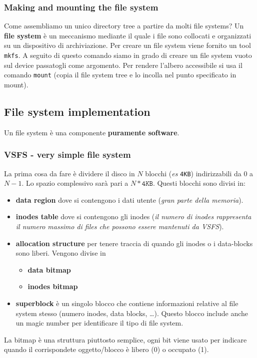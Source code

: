 \documentclass[12pt, letterpaper]{article}
\begin{document}
			\subsubsection{Making and mounting the file system}
				Come assembliamo un unico directory tree a partire da molti file systems? Un \textbf{file system} è un meccanismo mediante il quale i file sono collocati e organizzati su un dispositivo di archiviazione. Per creare un file system viene fornito un tool \texttt{mkfs}. A seguito di questo comando siamo in grado di creare un file system vuoto sul device passatogli come argomento. Per rendere l'albero accessibile si usa il comando \texttt{mount} (copia il file system tree e lo incolla nel punto specificato in mount).  
				 
		\subsection{File system implementation}
			Un file system è una componente \textbf{puramente software}.
			
			\subsubsection{VSFS - very simple file system}
				La prima cosa da fare è dividere il disco in $N$ blocchi (\textit{es} \texttt{4KB}) indirizzabili da $0$ a $N-1$. Lo spazio complessivo sarà pari a $N * \texttt{4KB}$. Questi blocchi sono divisi in:
				\begin{itemize}
					\item \textbf{data region} dove si contengono i dati utente (\textit{gran parte della memoria}).
					\item \textbf{inodes table} dove si contengono gli inodes (\textit{il numero di inodes rappresenta il numero massimo di files che possono essere mantenuti da VSFS}).
					\item \textbf{allocation structure} per tenere traccia di quando gli inodes o i data-blocks sono liberi. Vengono divise in
					\begin{itemize}
						\item \textbf{data bitmap}
						\item \textbf{inodes bitmap}
					\end{itemize}
					\item \textbf{superblock} è un singolo blocco che contiene informazioni relative al file system stesso (numero inodes, data blocks, \dots). Questo blocco include anche un magic number per identificare il tipo di file system.
				\end{itemize}				
				La bitmap è una struttura piuttosto semplice, ogni bit viene usato per indicare quando il corrispondete oggetto/blocco è libero (0) o occupato (1).
				
\end{document}
